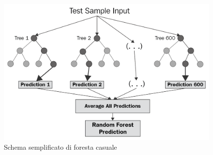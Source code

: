 \documentclass[%
    corpo=12pt,
    twoside,
    oldstyle,
    autoretitolo,
    greek,
    evenboxes,
]{toptesi}
\begin{document}
\begin{figure}[!ht]
  \includegraphics[width=\linewidth]{figure/rf.png}
  \caption{Schema semplificato di foresta casuale \cite{rf}}
  \label{fig:rf}
\end{figure}
\end{document}
